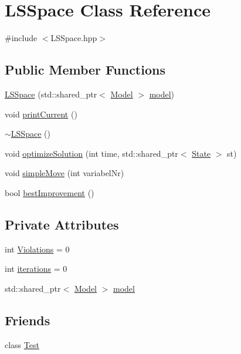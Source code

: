 \hypertarget{class_l_s_space}{\section{L\-S\-Space Class Reference}
\label{class_l_s_space}
}


{\ttfamily \#include $<$L\-S\-Space.\-hpp$>$}

\subsection*{Public Member Functions}
\begin{DoxyCompactItemize}
\item 
\hyperlink{class_l_s_space_aece02fa05f80f4714dc001c1a0ecb641}{L\-S\-Space} (std\-::shared\-\_\-ptr$<$ \hyperlink{class_model}{Model} $>$ \hyperlink{class_l_s_space_a3d1e22bec1da147a2ef457ead60d7d4f}{model})
\item 
void \hyperlink{class_l_s_space_a2b850707c65dd649a2bd97339190f9c5}{print\-Current} ()
\item 
\hyperlink{class_l_s_space_ad7f43b3e335d28922aa74a497e278386}{$\sim$\-L\-S\-Space} ()
\item 
void \hyperlink{class_l_s_space_a0560c7a6614859e8986da97860138db7}{optimize\-Solution} (int time, std\-::shared\-\_\-ptr$<$ \hyperlink{class_state}{State} $>$ st)
\item 
void \hyperlink{class_l_s_space_ac1fe2858bf40a20f80dcc5511ac96751}{simple\-Move} (int variabel\-Nr)
\item 
bool \hyperlink{class_l_s_space_ad84c52c66de00faa45dda05a88cdd040}{best\-Improvement} ()
\end{DoxyCompactItemize}
\subsection*{Private Attributes}
\begin{DoxyCompactItemize}
\item 
int \hyperlink{class_l_s_space_a6f9048fcca7d13ce4394154af5ba0ed2}{Violations} = 0
\item 
int \hyperlink{class_l_s_space_acfd6b86c42c63f43a29bee6853a2992e}{iterations} = 0
\item 
std\-::shared\-\_\-ptr$<$ \hyperlink{class_model}{Model} $>$ \hyperlink{class_l_s_space_a3d1e22bec1da147a2ef457ead60d7d4f}{model}
\end{DoxyCompactItemize}
\subsection*{Friends}
\begin{DoxyCompactItemize}
\item 
class \hyperlink{class_l_s_space_a5b78b1c2e1fa07ffed92da365593eaa4}{Test}
\end{DoxyCompactItemize}


